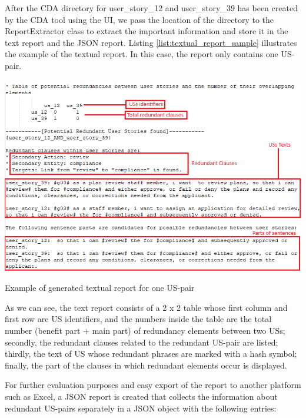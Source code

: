 \begin{example}
	After the CDA directory for user\_story\_12 and user\_story\_39 has been created by the CDA tool using the UI, we pass the location of the directory to the ReportExtractor class to extract the important information and store it in the text report and the JSON report.
	Listing \ref{list:textual_report_sample} illustrates the example of the textual report. In this case, the report only contains one US-pair.
	\begin{MyListing}
		\paragraph{}
		\centering
		\includegraphics[scale=0.69]{Listing/TextualReportSample.png}
		\caption{Example of generated textual report for one US-pair}\label{list:textual_report_sample}
	\end{MyListing}	
	As we can see, the text report consists of a 2 x 2 table whose first column and first row are US identifiers, and the numbers inside the table are the total number (benefit part + main part) of redundancy elements between two USs; secondly, the redundant clauses related to the redundant US-pair are listed; thirdly, the text of US whose redundant phrases are marked with a hash symbol; finally, the part of the clauses in which redundant elements occur is displayed.	
\end{example}
For further evaluation purposes and easy export of the report to another platform such as Excel, a JSON report is created that collects the information about redundant US-pairs separately in a JSON object with the following entries:
